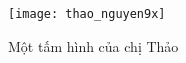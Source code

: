 \documentclass[a4paper]{report}
\begin{document}
\maketitle
\tableofcontents

%
%
%

% 







%


\begin{figure}[ht]
  \centering
  \texttt{[image: thao\_nguyen9x]}
  \caption{Một tấm hình của chị Thảo}
\end{figure}

\end{document}
